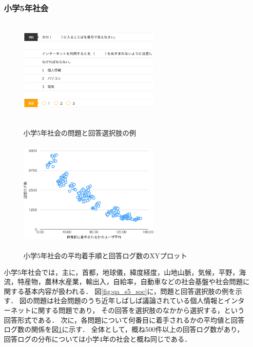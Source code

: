 \subsubsection{小学5年社会}
\begin{figure}[ht]
\begin{center}
	\includegraphics[width=200pt, height=150pt]{./img/qa_s5_soc.png}
	\caption{小学5年社会の問題と回答選択肢の例}
	\label{fig:qa_s5_soc}
\endminipage\hfill
{}
	\includegraphics[width=200pt, height=150pt]{./img/stats_s5_soc.pdf}
	\caption{小学5年社会の平均着手順と回答ログ数のXYプロット}
	\label{fig:stats_s5_soc}
\endminipage\hfill
\end{center}
\end{figure}
小学5年社会では，主に，首都，地球儀，緯度経度，山地山脈，気候，平野，海流，特産物，農林水産業，輸出入，自給率，自動車などの社会基盤や社会問題に関する基本内容が扱われる．
図\ref{fig:qa_s5_soc}に，問題と回答選択肢の例を示す．
図の問題は社会問題のうち近年しばしば議論されている個人情報とインターネットに関する問題であり，
その回答を選択肢のなかから選択する，という回答形式である．
次に，各問題について何番目に着手されるかの平均値と回答ログ数の関係を図\ref{fig:stats_s5_soc}に示す．
全体として，概ね500件以上の回答ログ数があり，回答ログの分布については小学4年の社会と概ね同じである．


